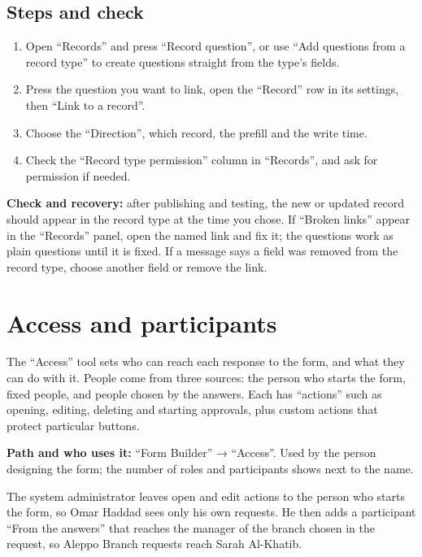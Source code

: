 \subsection{Steps and check}
\begin{enumerate}
\item Open “Records” and press “Record question”, or use “Add questions from a record type” to create questions straight from the type's fields.
\item Press the question you want to link, open the “Record” row in its settings, then “Link to a record”.
\item Choose the “Direction”, which record, the prefill and the write time.
\item Check the “Record type permission” column in “Records”, and ask for permission if needed.
\end{enumerate}

\textbf{Check and recovery:} after publishing and testing, the new or updated record should appear in the record type at the time you chose. If “Broken links” appear in the “Records” panel, open the named link and fix it; the questions work as plain questions until it is fixed. If a message says a field was removed from the record type, choose another field or remove the link.

\clearpage
\section{Access and participants}
\label{sec:builder-feature-forms-access}

The “Access” tool sets who can reach each response to the form, and what they can do with it. People come from three sources: the person who starts the form, fixed people, and people chosen by the answers. Each has “actions” such as opening, editing, deleting and starting approvals, plus custom actions that protect particular buttons.

\textbf{Path and who uses it:} “Form Builder” → “Access”. Used by the person designing the form; the number of roles and participants shows next to the name.

\begin{rcnote}
The system administrator leaves open and edit actions to the person who starts the form, so Omar Haddad sees only his own requests. He then adds a participant “From the answers” that reaches the manager of the branch chosen in the request, so Aleppo Branch requests reach Sarah Al-Khatib.
\end{rcnote}


